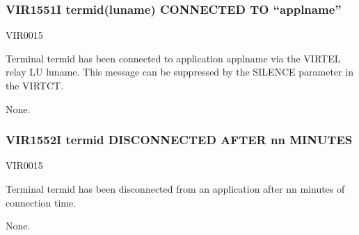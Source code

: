 \documentclass[letterpaper,10pt,english]{sphinxmanual}
\begin{document}
\begin{sphinxVerbatim}[commandchars=\\\{\}]
           
                            
                                    
                                       
\end{sphinxVerbatim}


\subsubsection{VIR1551I termid(luname) CONNECTED TO “applname”}
\label{\detokenize{messages:vir1551i-termid-luname-connected-to-applname}}\begin{description}
\sphinxAtStartPar
VIR0015

\sphinxAtStartPar
Terminal termid has been connected to application applname via the VIRTEL relay LU luname. This message can be suppressed by the SILENCE parameter in the VIRTCT.

\sphinxAtStartPar
None.

\end{description}


\subsubsection{VIR1552I termid DISCONNECTED AFTER nn MINUTES}
\label{\detokenize{messages:vir1552i-termid-disconnected-after-nn-minutes}}\begin{description}
\sphinxAtStartPar
VIR0015

\sphinxAtStartPar
Terminal termid has been disconnected from an application after nn minutes of connection time.

\sphinxAtStartPar
None.

\end{description}
\end{document}
